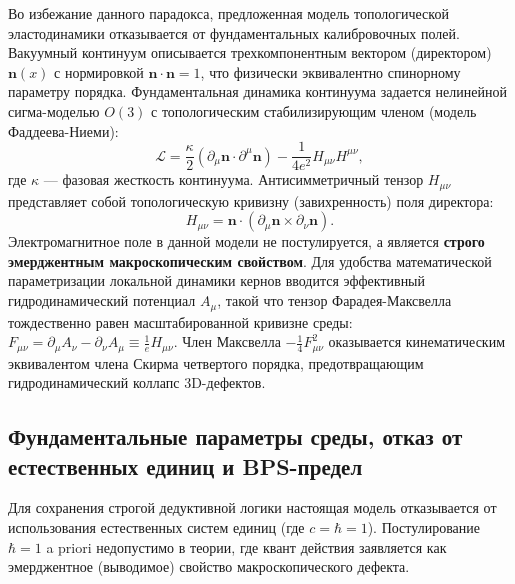\documentclass[11pt,a4paper]{article}
\begin{document}
	Во избежание данного парадокса, предложенная модель топологической эластодинамики отказывается от фундаментальных калибровочных полей. Вакуумный континуум описывается трехкомпонентным вектором (директором) $\mathbf{n}(x)$ с нормировкой $\mathbf{n} \cdot \mathbf{n} = 1$, что физически эквивалентно спинорному параметру порядка. 
	Фундаментальная динамика континуума задается нелинейной сигма-моделью $O(3)$ с топологическим стабилизирующим членом (модель Фаддеева-Ниеми):
	\begin{equation}
		\mathcal{L} = \frac{\kappa}{2} (\partial_\mu \mathbf{n} \cdot \partial^\mu \mathbf{n}) - \frac{1}{4e^2} H_{\mu\nu} H^{\mu\nu},
	\end{equation}
	где $\kappa$ — фазовая жесткость континуума. Антисимметричный тензор $H_{\mu\nu}$ представляет собой топологическую кривизну (завихренность) поля директора:
	\begin{equation}
		H_{\mu\nu} = \mathbf{n} \cdot (\partial_\mu \mathbf{n} \times \partial_\nu \mathbf{n}).
	\end{equation}
	Электромагнитное поле в данной модели не постулируется, а является \textbf{строго эмерджентным макроскопическим свойством}. Для удобства математической параметризации локальной динамики кернов вводится эффективный гидродинамический потенциал $A_\mu$, такой что тензор Фарадея-Максвелла тождественно равен масштабированной кривизне среды: $F_{\mu\nu} = \partial_\mu A_\nu - \partial_\nu A_\mu \equiv \frac{1}{e} H_{\mu\nu}$. Член Максвелла $-\frac{1}{4}F_{\mu\nu}^2$ оказывается кинематическим эквивалентом члена Скирма четвертого порядка, предотвращающим гидродинамический коллапс 3D-дефектов.
	
	\subsection{Фундаментальные параметры среды, отказ от естественных единиц и BPS-предел}
	Для сохранения строгой дедуктивной логики настоящая модель отказывается от использования естественных систем единиц (где $c = \hbar = 1$). Постулирование $\hbar=1$ a priori недопустимо в теории, где квант действия заявляется как эмерджентное (выводимое) свойство макроскопического дефекта.
	
\end{document}
